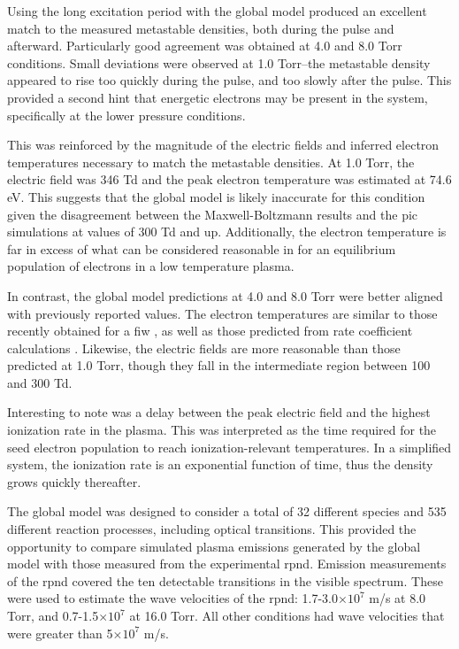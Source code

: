 Using the long excitation period with the global model produced an excellent
match to the measured metastable densities, both during the pulse and afterward.
Particularly good agreement was obtained at 4.0 and 8.0 Torr conditions. Small
deviations were observed at 1.0 Torr--the metastable density appeared to rise
too quickly during the pulse, and too slowly after the pulse. This provided a
second hint that energetic electrons may be present in the system, specifically
at the lower pressure conditions.

This was reinforced by the magnitude of the electric fields and inferred
electron temperatures necessary to match the metastable densities. At 1.0 Torr,
the electric field was 346 Td and the peak electron temperature was estimated at
74.6 eV. This suggests that the global model is likely inaccurate for this
condition given the disagreement between the Maxwell-Boltzmann results and the
\acs{pic} simulations at values of 300 Td and up. Additionally, the electron
temperature is far in excess of what can be considered reasonable in for an
equilibrium population of electrons in a low temperature plasma.

In contrast, the global model predictions at 4.0 and 8.0 Torr were better
aligned with previously reported values. The electron temperatures are similar
to those recently obtained for a \acs{fiw} \cite{Takashima2011}, as well as
those predicted from rate coefficient calculations \cite{Aleksandrov2007}.
Likewise, the electric fields are more reasonable than those predicted at 1.0
Torr, though they fall in the intermediate region between 100 and 300 Td.

Interesting to note was a delay between the peak electric field and the highest
ionization rate in the plasma. This was interpreted as the time required for the
seed electron population to reach ionization-relevant temperatures. In a
simplified system, the ionization rate is an exponential function of time,
thus the density grows quickly thereafter.

The global model was designed to consider a total of 32 different species and
535 different reaction processes, including optical transitions. This provided
the opportunity to compare simulated plasma emissions generated by the global
model with those measured from the experimental \acs{rpnd}. Emission
measurements of the \acs{rpnd} covered the ten detectable transitions in the
visible spectrum. These were used to estimate the wave velocities of the
\acs{rpnd}: 1.7-3.0$\times10^7$ m/s at 8.0 Torr, and 0.7-1.5$\times10^7$ at 16.0
Torr. All other conditions had wave velocities that were greater than
5$\times10^7$ m/s.

